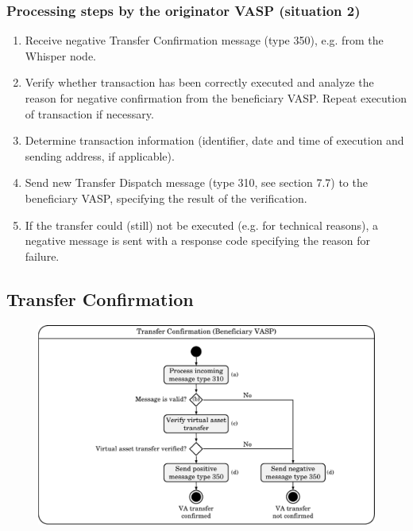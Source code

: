 \documentclass{article}
\begin{document}
\subsubsection{Processing steps by the originator VASP (situation 2)}
\begin{enumerate}
    \item Receive negative Transfer Confirmation message (type 350), e.g. from the Whisper node.
    \item Verify whether transaction has been correctly executed and analyze the reason for negative confirmation from the beneficiary VASP. Repeat execution of transaction if necessary.
    \item Determine transaction information (identifier, date and time of execution and sending address, if applicable).
    \item Send new Transfer Dispatch message (type 310, see section 7.7) to the beneficiary VASP, specifying the result of the verification.
    \item If the transfer could (still) not be executed (e.g. for technical reasons), a negative message is sent with a response code specifying the reason for failure.
\end{enumerate}

\newpage
\subsection{Transfer Confirmation}
\begin{figure}[h]
    \centering
    \includegraphics[width=\textwidth]{g14.pdf}
\end{figure}
\end{document}
